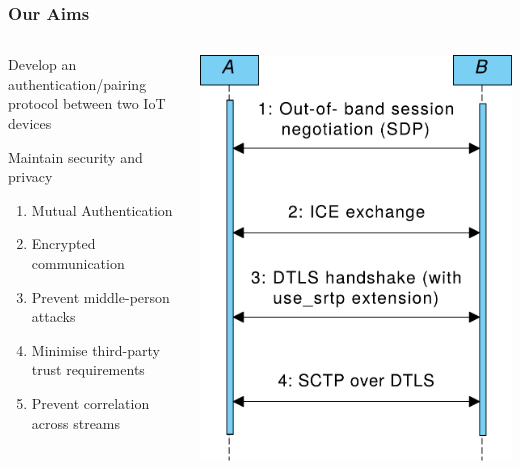 \documentclass[handout, notes=hide]{beamer}
\begin{document}
\begin{frame}
\frametitle{Our Aims}

\begin{columns}[T]
\begin{column}[T]{0.6\textwidth}
\setlength{\parskip}{0.5em}

Develop an authentication/pairing protocol between two IoT devices

Maintain security and privacy

\begin{enumerate}
\item Mutual Authentication
\item Encrypted communication
\item Prevent middle-person attacks
\item Minimise third-party trust requirements
\item Prevent correlation across streams
\end{enumerate}

\end{column}
\begin{column}[T]{0.4\textwidth}
\vspace{2.5em}
\includegraphics[width=1.0\textwidth]{webrtc-simplified-thinner}
\end{column}
\end{columns}

\end{frame}
\end{document}

